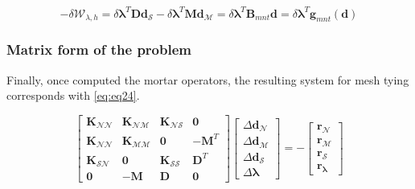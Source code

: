 \documentclass[a4paper,10pt]{article} %
\begin{document}
\begin{equation}\label{eq:eq23}
    -\delta \mathcal{W}_{\lambda,h} = \delta \boldsymbol{\lambda}^T\mathbf{D}\mathbf{d}_{\mathcal{S}} - \delta \boldsymbol{\lambda}^T\mathbf{M}\mathbf{d}_{\mathcal{M}}= \delta \boldsymbol{\lambda}^T \mathbf{B}_{mnt} \mathbf{d} = \delta \boldsymbol{\lambda}^T \mathbf{g}_{mnt}(\mathbf{d})
\end{equation}

\subsubsection{Matrix form of the problem}

Finally, once computed the mortar operators, the resulting system for mesh tying corresponds with \eqref{eq:eq24}.

\begin{equation}\label{eq:eq24}
    \left[ \begin{array}{cccc} \mathbf{K}_{\mathcal{N}\mathcal{N}} &  \mathbf{K}_{\mathcal{N}\mathcal{M}} & \mathbf{K}_{\mathcal{N}\mathcal{S}} & \mathbf{0} \\ \mathbf{K}_{\mathcal{N}\mathcal{N}}  & \mathbf{K}_{\mathcal{M}\mathcal{M}} & \mathbf{0} & -\mathbf{M}^{T} \\ \mathbf{K}_{\mathcal{S}\mathcal{N}} & \mathbf{0} & \mathbf{K}_{\mathcal{S}\mathcal{S}} & \mathbf{D}^T \\ \mathbf{0} & -\mathbf{M} & \mathbf{D} & \mathbf{0}   \end{array} \right] \left[ \begin{array}{c} \Delta\mathbf{d}_{\mathcal{N}} \\ \Delta\mathbf{d}_{\mathcal{M}} \\ \Delta\mathbf{d}_{\mathcal{S}} \\ \Delta\boldsymbol{\lambda} \end{array} \right] = - \left[ \begin{array}{c} \mathbf{r}_{\mathcal{N}} \\ \mathbf{r}_{\mathcal{M}} \\ \mathbf{r}_{\mathcal{S}} \\ \mathbf{r}_{\boldsymbol{\lambda}} \end{array} \right] 
\end{equation}
\end{document}
